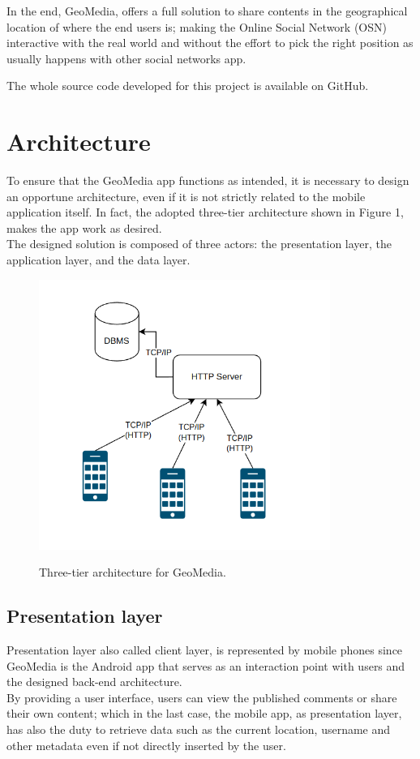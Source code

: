 \documentclass[conference]{IEEEtran}
\begin{document}
In the end, GeoMedia, offers a full solution to share contents in the geographical location of where the end users is; making the Online Social Network (OSN) interactive with the real world and without the effort to pick the right position as usually happens with other social networks app.

The whole source code developed for this project is available on GitHub. \cite{gh}


\section{Architecture}\label{Architecture:panoramic}

To ensure that the GeoMedia app functions as intended, it is necessary to design an opportune architecture, even if it is not strictly related to the mobile application itself.
In fact, the adopted three-tier architecture shown in Figure 1, makes the app work as desired.
\\
The designed solution is composed of three actors: the presentation layer, the application layer, and the data layer.

\begin{figure}[htbp]
{\includegraphics[width=9.5cm]{imgs/Architecture.png}}
\caption{Three-tier architecture for GeoMedia.}
\label{fig}
\end{figure}


\subsection{Presentation layer}
Presentation layer also called client layer, is represented by mobile phones since GeoMedia is the Android app that serves as an interaction point with users and the designed back-end architecture.
\\
By providing a user interface, users can view the published comments or share their own content; which in the last case, the mobile app, as presentation layer, has also the duty to retrieve data such as the current location, username and other metadata even if not directly inserted by the user.
\end{document}
